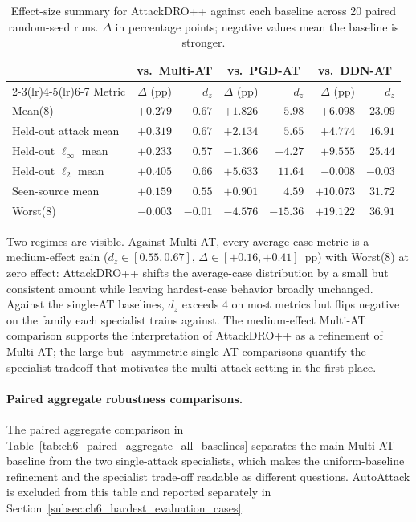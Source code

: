 \begin{table}[H]
\centering
\caption[AttackDRO++ effect sizes]{Effect-size summary for AttackDRO++ against each baseline across 20 paired random-seed runs.
$\Delta$ in percentage points; negative values mean the baseline is
stronger.}
\label{tab:ch6_effect_size_summary}
\small
\setlength{\tabcolsep}{4pt}
\renewcommand{\arraystretch}{1.10}
\begin{tabular}{lrrrrrr}
\toprule
& \multicolumn{2}{c}{vs.\ Multi-AT} & \multicolumn{2}{c}{vs.\ PGD-AT} & \multicolumn{2}{c}{vs.\ DDN-AT} \\
\cmidrule(lr){2-3}\cmidrule(lr){4-5}\cmidrule(lr){6-7}
Metric            & $\Delta$ (pp) & $d_z$    & $\Delta$ (pp) & $d_z$     & $\Delta$ (pp) & $d_z$ \\
\midrule
Mean(8)           & $+0.279$ & $0.67$   & $+1.826$ & $5.98$    & $+6.098$ & $23.09$ \\
Held-out attack mean & $+0.319$ & $0.67$   & $+2.134$ & $5.65$    & $+4.774$ & $16.91$ \\
\quad Held-out $\ell_\infty$ mean & $+0.233$ & $0.57$   & $-1.366$ & $-4.27$   & $+9.555$ & $25.44$ \\
\quad Held-out $\ell_2$ mean      & $+0.405$ & $0.66$   & $+5.633$ & $11.64$   & $-0.008$ & $-0.03$ \\
Seen-source mean  & $+0.159$ & $0.55$   & $+0.901$ & $4.59$    & $+10.073$ & $31.72$ \\
\midrule
Worst(8)          & $-0.003$ & $-0.01$  & $-4.576$ & $-15.36$  & $+19.122$ & $36.91$ \\
\bottomrule
\end{tabular}
\end{table}

Two regimes are visible. Against Multi-AT, every average-case metric is a
medium-effect gain ($d_z \in [0.55, 0.67]$, $\Delta \in [+0.16, +0.41]$~pp)
with Worst(8) at zero effect: AttackDRO++ shifts the average-case
distribution by a small but consistent amount while leaving
hardest-case behavior broadly unchanged. Against the single-AT baselines, $d_z$ exceeds $4$
on most metrics but flips negative on the family each specialist trains
against. The medium-effect Multi-AT comparison supports the interpretation of
AttackDRO++ as a refinement of Multi-AT; the large-but-
asymmetric single-AT comparisons quantify the specialist tradeoff that
motivates the multi-attack setting in the first place.

\paragraph{Paired aggregate robustness comparisons.}
The paired aggregate comparison in Table~\ref{tab:ch6_paired_aggregate_all_baselines}
separates the main Multi-AT baseline from the two single-attack specialists, which makes
the uniform-baseline refinement and the specialist trade-off readable as different
questions. AutoAttack is excluded from this table and reported separately in
Section~\ref{subsec:ch6_hardest_evaluation_cases}.

